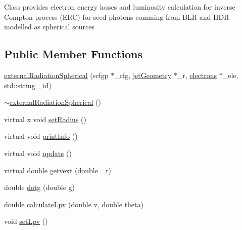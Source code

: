 Class provides electron energy losses and luminosity calculation for inverse Compton process (E\-R\-C) for seed photons comming from B\-L\-R and H\-D\-R modelled as spherical sources \subsection*{Public Member Functions}
\begin{DoxyCompactItemize}
\item 
\hyperlink{classexternalRadiationSpherical_a8bc8c23cc374776d0c4431751dda67ed}{external\-Radiation\-Spherical} (scfgp $\ast$\-\_\-cfg, \hyperlink{classjetGeometry}{jet\-Geometry} $\ast$\-\_\-r, \hyperlink{classelectrons}{electrons} $\ast$\-\_\-ele, std\-::string \-\_\-id)
\item 
\hyperlink{classexternalRadiationSpherical_a9dbb13ad97d392d224e102a6f3eab62d}{$\sim$external\-Radiation\-Spherical} ()
\item 
virtual x void \hyperlink{classexternalRadiationSpherical_a560bd33ee97e6bdc7dc0d6138705e9b3}{set\-Radius} ()
\item 
virtual void \hyperlink{classexternalRadiationSpherical_a232684df0d246d8c5ec06e832bbaad0f}{print\-Info} ()
\item 
virtual void \hyperlink{classexternalRadiationSpherical_a05f5cf91c3a3c7844b167ff4476e64f8}{update} ()
\item 
virtual double \hyperlink{classexternalRadiationSpherical_a444023a18bd55023dc806bd0acccb7a0}{getvext} (double \-\_\-r)
\item 
double \hyperlink{classexternalRadiationSpherical_a96a2857022de4cc79852824610943910}{dotg} (double g)
\item 
double \hyperlink{classexternalRadiationSpherical_ac30f8dcecd62a05ff85140112c4e9b9c}{calculate\-Lpv} (double v, double theta)
\item 
void \hyperlink{classexternalRadiationSpherical_a2868df3597900f03c135baef15c825a8}{set\-Lpv} ()
\end{DoxyCompactItemize}
